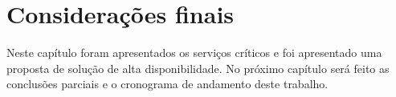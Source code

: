 % 
% 
% 
% 


\section{Considerações finais}

Neste capítulo foram apresentados os serviços críticos e foi apresentado uma proposta de solução de alta disponibilidade.
No próximo capítulo será feito as conclusões parciais e o cronograma de andamento deste trabalho.

